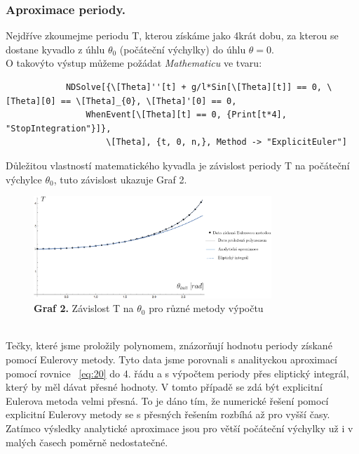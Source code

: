\documentclass[reqno, a4paper]{amsart}
\begin{document}
		\subsubsection{Aproximace periody.} Nejdříve zkoumejme periodu T, kterou získáme jako 4krát dobu, za kterou se dostane kyvadlo z úhlu $\theta_{0}$ (počáteční výchylky) do úhlu $\theta=0$. 
		\\
		O takovýto výstup můžeme požádat \textit{Mathematicu} ve tvaru:  
		\begin{verbatim}
			NDSolve[{\[Theta]''[t] + g/l*Sin[\[Theta][t]] == 0, \[Theta][0] == \[Theta]_{0}, \[Theta]'[0] == 0, 
				WhenEvent[\[Theta][t] == 0, {Print[t*4], "StopIntegration"}]}, 
					\[Theta], {t, 0, n,}, Method -> "ExplicitEuler"]
		\end{verbatim}
		Důležitou vlastností matematického kyvadla je závislost periody T na počáteční výchylce $\theta_{0}$, tuto závislost ukazuje Graf 2.
		\begin{figure}[h]
			\centering
			\includegraphics[width=0.8\textwidth]{graf1}
			\caption*{\textbf{Graf 2.} Závislost T na $\theta_{0}$ pro různé metody výpočtu}  
		\end{figure}
		\\
		Tečky, které jsme proložily polynomem, znázorňují hodnotu periody získané pomocí Eulerovy metody. Tyto data jsme porovnali s analityckou aproximací pomocí rovnice ~\eqref{eq:20} do 4. řádu a s výpočtem periody přes eliptický integrál, který by měl dávat přesné hodnoty.
		V tomto případě se zdá být explicitní Eulerova metoda velmi přesná. To je dáno tím, že numerické řešení pomocí explicitní Eulerovy metody se s přesných řešením rozbíhá až pro vyšší časy. Zatímco výsledky analytické aproximace jsou pro větší počáteční výchylky už i v malých časech poměrně nedostatečné.
		\\
		\\
\end{document}
